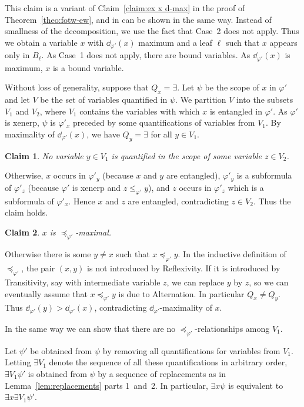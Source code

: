 \documentclass{LMCS}
\newtheorem{clam}{Claim}
\renewcommand{\phi}{\varphi}
\newcommand{\refl}{Reflexivity}
\newcommand{\trans}{Transitivity}
\newcommand{\alt}{Alternation}
\begin{document}
\proof
This claim is a variant of Claim~\ref{claim:ex x d-max} 
in the proof of Theorem~\ref{theo:fotw-ew}, 
and in can be shown in the same way. 
Instead of smallness of the decomposition, 
we use the fact that Case~2 does not apply. 
Thus we obtain a variable $x$ with $\dd_{\phi'}(x)$ maximum 
and a leaf $\ell$ such that $x$ appears only in $B_{\ell}$. 
As Case~1 does not apply, there are bound variables. 
As $\dd_{\phi'}(x)$ is maximum, $x$ is a bound variable. 
\cqed

Without loss of generality, suppose that $Q_x=\exists$. 
Let $\psi$ be the scope of $x$ in $\phi'$ 
and let $V$ be the set of variables quantified in $\psi$. 
We partition $V$ into the subsets $V_1$ and $V_2$, 
where $V_1$ contains the variables with which $x$ is entangled in $\phi'$. 
As $\phi'$ is xenerp, $\psi$ is 
$\phi'_x$ preceded by some quantifications of variables from $V_1$. 
By maximality of $\dd_{\phi'}(x)$, we have $Q_y=\exists$ for all $y\in V_1$. 

\begin{clam}\label{claim:V2 </= V1}
No variable $y\in V_1$ is quantified in the scope of some variable $z\in V_2$. 
\end{clam}

\proof
Otherwise, $x$ occurs in $\phi'_y$ (because $x$ and $y$ are entangled), 
$\phi'_y$ is a subformula of $\phi'_z$ 
(because $\phi'$ is xenerp and $z\leq_{\phi'}y$), 
and $z$ occurs in $\phi'_z$ which is a subformula of $\phi'_x$. 
Hence $x$ and $z$ are entangled, contradicting $z\in V_2$.
Thus the claim holds.
\cqed

\begin{clam}\label{claim:x preceq-max}
$x$ is $\preceq_{\phi'}$-maximal. 
\end{clam}

\proof
Otherwise there is some $y\not=x$ such that $x\preceq_{\phi'}y$. 
In the inductive definition of $\preceq_{\phi'}$, 
the pair $(x,y)$ is not introduced by \refl. 
If it is introduced by \trans, say with intermediate variable $z$, 
we can replace $y$ by $z$, 
so we can eventually assume that $x\preceq_{\phi'}y$ is due to \alt. 
In particular $Q_x\not=Q_y$. 
Thus $\dd_{\phi'}(y)>\dd_{\phi'}(x)$, 
contradicting $\dd_{\phi'}$-maximality of $x$. 
\cqed

In the same way we can show
that there are no $\preceq_{\phi'}$-relationships among $V_1$. 

Let $\psi'$ be obtained from $\psi$ 
by removing all quantifications for variables from $V_1$. 
Letting $\exists V_1$ denote the sequence of all these quantifications 
in arbitrary order, 
$\exists V_1\psi'$ is obtained from $\psi$ 
by a sequence of replacements 
as in Lemma~\ref{lem:replacements} parts 1~and~2. 
In particular, $\exists x\psi$ is equivalent to $\exists x\exists V_1\psi'$. 
\end{document}
